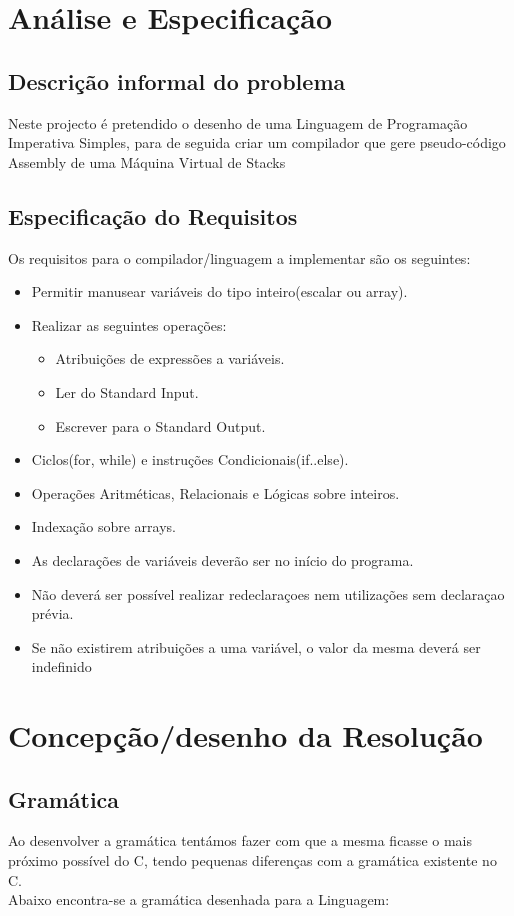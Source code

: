 \documentclass{report}
\begin{document}
\chapter{Análise e Especificação} \label{analiseEsp}

\section{Descrição informal do problema}
Neste projecto é pretendido o desenho de uma Linguagem de Programação Imperativa Simples, para de seguida criar um compilador que gere pseudo-código Assembly de uma Máquina Virtual de Stacks
\section{Especificação do Requisitos}
Os requisitos para o compilador/linguagem a implementar são os seguintes:
\begin{itemize}
  \item Permitir manusear variáveis do tipo inteiro(escalar ou array).
  \item Realizar as seguintes operações:
	\begin{itemize}
	\item Atribuições de expressões a variáveis.
	\item Ler do Standard Input.
	\item Escrever para o Standard Output.
	\end{itemize}
 \item Ciclos(for, while) e instruções Condicionais(if..else).
 \item Operações Aritméticas, Relacionais e Lógicas sobre inteiros.
 \item Indexação sobre arrays.
 \item As declarações de variáveis deverão ser no início do programa.
 \item Não deverá ser possível realizar redeclaraçoes nem utilizações sem declaraçao prévia.
 \item Se não existirem atribuições a uma variável, o valor da mesma deverá ser indefinido
\end{itemize}

\chapter{Concepção/desenho da Resolução} \label{concepcao}
\section{Gramática}
Ao desenvolver a gramática tentámos fazer com que a mesma ficasse o mais próximo possível do C, tendo pequenas diferenças com a gramática existente no C.\\Abaixo encontra-se a gramática desenhada para a Linguagem:
\end{document}
